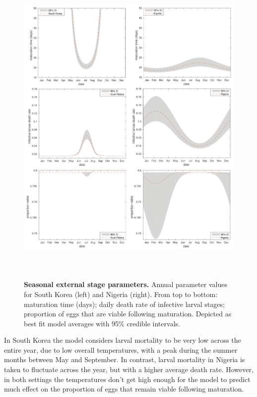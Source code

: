 \begin{figure}[!ht]
\includegraphics[height=16cm]{Project/Figures/STH/Fig6.pdf}
\caption[Annual external stage parameter profiles (South Korea and Nigeria).]{{\bf Seasonal external stage parameters.}
Annual parameter values for South Korea (left) and Nigeria (right). From top to bottom: maturation time (days); daily death rate of infective larval stages; proportion of eggs that are viable following maturation. Depicted as best fit model averages with 95\% credible intervals.}
\label{Fig6}
\end{figure} 

In South Korea the model considers larval mortality to be very low across the entire year, due to low overall temperatures, with a peak during the summer months between May and September. In contrast, larval mortality in Nigeria is taken to fluctuate across the year, but with a higher average death rate. However, in both settings the temperatures don't get high enough for the model to predict much effect on the proportion of eggs that remain viable following maturation.


